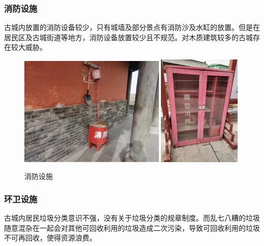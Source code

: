 \documentclass[UTF8]{ctexart}
\begin{document}
        \subsubsection{消防设施}
        古城内放置的消防设备较少，只有城墙及部分景点有消防沙及水缸的放置。但是在居民区及古城街道等地方，消防设备放置较少且不规范。对木质建筑较多的古城存在较大威胁。
        \begin{figure}[H]
            \centering
            \includegraphics[width=7cm]{图片 15.png}
            \includegraphics[width=4cm]{图片 17.png}
            \caption{消防设施}
    
        \end{figure}
        \subsubsection{环卫设施}
        古城内居民垃圾分类意识不强，没有关于垃圾分类的规章制度。而乱七八糟的垃圾随意混杂在一起会对其他可回收利用的垃圾造成二次污染，导致可回收利用的垃圾不可再回收，使得资源浪费。
\end{document}
